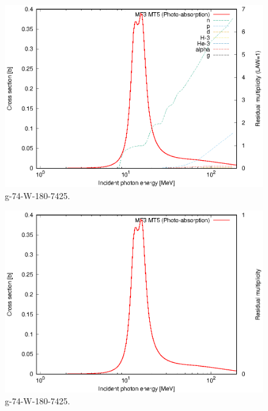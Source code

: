 \begin{figure}
 \includegraphics[width=\linewidth]{eps/g_74-W-180_7425.eps}
  \caption{g-74-W-180-7425.}
\end{figure}
\begin{figure}
 \includegraphics[width=\linewidth]{eps-law0/g_74-W-180_7425.eps}
 \caption{g-74-W-180-7425.}
\end{figure}
\newpage \clearpage

